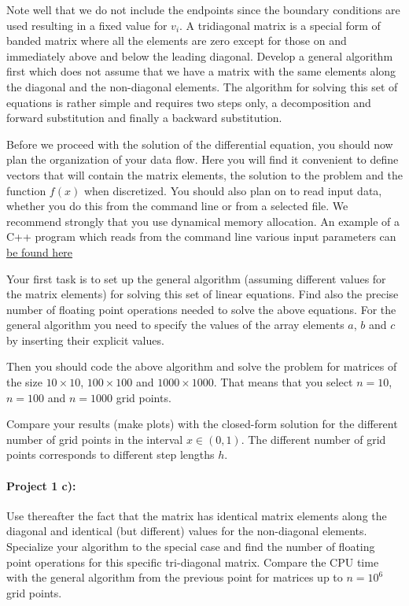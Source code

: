 \documentclass[%
oneside,                 %
final,                   %
10pt]{article}
\begin{document}
Note well that we do not include the endpoints since the boundary
conditions are used resulting in a fixed value for $v_i$.  A
tridiagonal matrix is a special form of banded matrix where all the
elements are zero except for those on and immediately above and below
the leading diagonal.  Develop a general algorithm first which does
not assume that we have a matrix with the same elements along the
diagonal and the non-diagonal elements.  The algorithm for solving
this set of equations is rather simple and requires two steps only, a
decomposition and forward substitution and finally a backward
substitution.

Before we proceed with the solution of the differential equation, you should now plan the organization of your data flow. Here you will find it convenient to define vectors that will contain the matrix elements, the solution to the problem and the function $f(x)$ when discretized. You should also plan on to read input data, whether you do this from the command line or from a selected file. We recommend strongly that you use dynamical memory allocation.
An example of a C++ program which reads from the command line various input parameters can \href{{https://github.com/CompPhysics/ComputationalPhysicsMSU/blob/master/doc/Projects/2018/Project1/CodeExamples/TridiagonalSimple.cpp}}{be found here}

Your first task is to set up the general algorithm (assuming different
values for the matrix elements) for solving this set of linear
equations.  Find also the precise number of floating point operations
needed to solve the above equations. For the general algorithm you
need to specify the values of the array elements $a$, $b$ and $c$ by
inserting their explicit values.


Then you should code the above algorithm and solve the problem for matrices of the size
$10\times 10$, $100\times 100$ and $1000\times 1000$.  That means that you select $n=10$, $n=100$ and
$n=1000$ grid points. 

Compare your results (make plots) with the closed-form solution for the different number of grid points  in the 
interval $x\in(0,1)$.  The different number of grid points corresponds to different step lengths $h$.


\paragraph{Project 1 c):}
Use thereafter the fact that the matrix has identical matrix elements along the diagonal and identical (but different) values for the non-diagonal elements. Specialize your algorithm to the special case and find the number of floating point operations
for this specific tri-diagonal matrix. Compare the CPU time with the general algorithm from the previous point for matrices up to  $n=10^6$ grid points. 
\end{document}
